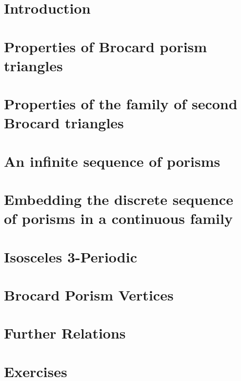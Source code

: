 
\section{ Introduction}
\label{sec:06_introd}


\section{Properties of Brocard porism triangles}
\label{sec:review}


\section[Properties of second Brocard triangles]{Properties of the family of second Brocard triangles}
\label{sec:broc-second}


\section{An infinite sequence of porisms}
\label{sec:porism-seq}


\section[Embedding of porisms in a continuous family]{Embedding the discrete sequence of porisms in a continuous family}
\label{sec:continuous}


 \section{Isosceles 3-Periodic}
\label{app:isosceles}


\section{Brocard Porism Vertices}
\label{app:app_vertices}


\section{Further Relations}
\label{app:app_further}


\section{Exercises}
\label{sec:06-exercises}


